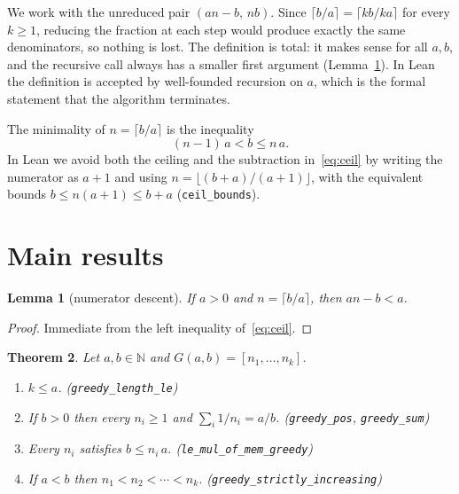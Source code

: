 \documentclass[11pt]{article}
\newtheorem{theorem}{Theorem}
\newtheorem{lemma}[theorem]{Lemma}
\theoremstyle{definition}
\theoremstyle{remark}
\begin{document}
We work with the unreduced pair $(an-b,\,nb)$. Since $\lceil b/a \rceil = \lceil kb/ka \rceil$ for
every $k \ge 1$, reducing the fraction at each step would produce exactly the same denominators,
so nothing is lost. The definition is total: it makes sense for all $a, b$, and the recursive call
always has a smaller first argument (Lemma~\ref{lem:descent}). In Lean the definition is accepted
by well-founded recursion on $a$, which is the formal statement that the algorithm terminates.

The minimality of $n = \lceil b/a \rceil$ is the inequality
\begin{equation}\label{eq:ceil}
  (n-1)\,a < b \le n\,a .
\end{equation}
In Lean we avoid both the ceiling and the subtraction in~\eqref{eq:ceil} by writing the numerator
as $a+1$ and using $n = \lfloor (b+a)/(a+1) \rfloor$, with the equivalent bounds
$b \le n(a+1) \le b+a$ (\texttt{ceil\_bounds}).

\section{Main results}

\begin{lemma}[numerator descent]\label{lem:descent}
If $a > 0$ and $n = \lceil b/a \rceil$, then $an - b < a$.
\end{lemma}

\begin{proof}
Immediate from the left inequality of~\eqref{eq:ceil}.
\end{proof}

\begin{theorem}\label{thm:main}
Let $a, b \in \mathbb{N}$ and $G(a,b) = [n_1, \dots, n_k]$.
\begin{enumerate}
  \item $k \le a$. \hfill (\texttt{greedy\_length\_le})
  \item If $b > 0$ then every $n_i \ge 1$ and $\sum_{i} 1/n_i = a/b$.
    \hfill (\texttt{greedy\_pos}, \texttt{greedy\_sum})
  \item Every $n_i$ satisfies $b \le n_i\, a$. \hfill (\texttt{le\_mul\_of\_mem\_greedy})
  \item If $a < b$ then $n_1 < n_2 < \cdots < n_k$.
    \hfill (\texttt{greedy\_strictly\_increasing})
\end{enumerate}
\end{theorem}
\end{document}
